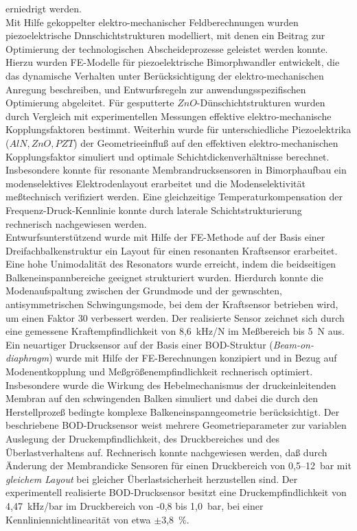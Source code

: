 erniedrigt werden.\\
%
%
Mit Hilfe gekoppelter elektro-mechanischer Feldberechnungen wurden
piezoelektrische Dnnschichtstrukturen modelliert, mit denen ein Beitrag
zur Optimierung der technologischen Abscheideprozesse geleistet werden
konnte. Hierzu wurden FE-Modelle für piezoelektrische Bimorphwandler
entwickelt, die das dynamische Verhalten unter Berücksichtigung der
elektro-mechanischen Anregung beschreiben, und Entwurfsregeln zur
anwendungsspezifischen Optimierung abgeleitet.
Für gesputterte $ZnO$-Dünschichtstrukturen wurden durch Vergleich mit
experimentellen Messungen effektive elektro-mechanische Kopplungsfaktoren
bestimmt. Weiterhin wurde für unterschiedliche Piezoelektrika
($AlN, ZnO, PZT$) der Geometrieeinfluß auf den effektiven
elektro-mechanischen Kopplungsfaktor simuliert und optimale
Schichtdickenverhältnisse berechnet. Insbesondere konnte für resonante
Membrandrucksensoren in Bimorphaufbau ein modenselektives
Elektrodenlayout erarbeitet und die Modenselektivität meßtechnisch
verifiziert werden.
Eine gleichzeitige Temperaturkompensation der Frequenz-Druck-Kennlinie
konnte durch laterale Schichtstrukturierung rechnerisch nachgewiesen
werden.\\
%
%
Entwurfsunterstützend wurde mit Hilfe der FE-Methode auf der Basis einer
Dreifachbalkenstruktur ein Layout für einen resonanten Kraftsensor
erarbeitet. Eine hohe Uni\-modalität des Resonators wurde erreicht,
indem die beidseitigen Balkeneinspannbereiche geeignet strukturiert wurden.
Hierdurch konnte die Modenaufspaltung zwischen der Grundmode und der
gewnschten, antisymmetrischen Schwingungsmode, bei dem der Kraftsensor
betrieben wird, um einen Faktor 30 verbessert werden.
Der realisierte Sensor zeichnet sich durch eine gemessene
Kraftempfindlichkeit von 8,6~kHz/N im Meßbereich bis 5~N aus.\\
%
Ein neuartiger Drucksensor auf der Basis einer BOD-Struktur
({\em Beam-on-diaphragm}) wurde mit Hilfe der FE-Berechnungen
konzipiert und in Bezug auf Modenentkopplung und
Meßgrößenempfindlichkeit rechnerisch optimiert. Insbesondere wurde
die Wirkung des Hebelmechanismus der druckeinleitenden Membran auf den
schwingenden Balken simuliert und dabei die durch den Herstellprozeß
bedingte komplexe Balkeneinspanngeometrie berücksichtigt.
Der beschriebene BOD-Drucksensor weist mehrere Geometrieparameter zur
variablen Auslegung der Druckempfindlichkeit, des
Druckbereiches und des Überlastverhaltens auf. Rechnerisch konnte
nachgewiesen werden, daß durch Änderung der Membrandicke
Sensoren für einen Druckbereich von 0,5--12~bar mit {\em gleichem Layout}
bei gleicher Überlastsicherheit herzustellen sind.
Der experimentell realisierte BOD-Drucksensor besitzt eine
Druckempfindlichkeit von 4,47~kHz/bar im Druckbereich von -0,8 bis 1,0~bar,
bei einer Kennliniennichtlinearität von etwa $\pm$3,8~\%.


